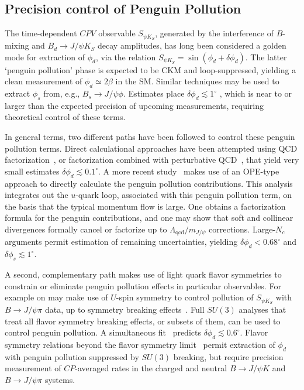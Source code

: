 \subsection{Precision control of Penguin Pollution}
The time-dependent $CPV$ observable $S_{\psi K_S}$, generated by the interference of $B$-mixing and $B_d \to J/\psi K_S$ decay amplitudes, has long been considered a golden mode for extraction of $\phi_d$, via the relation $S_{\psi K_S} = \sin (\phi_d + \delta \phi_d)$. The latter `penguin pollution' phase is expected to be CKM and loop-suppressed, yielding a clean measurement of $\phi_d \simeq 2 \beta$ in the SM. Similar techniques may be used to extract $\phi_s$ from, e.g., $B_s \to J/\psi \phi$. Estimates place $\delta \phi_d \lesssim 1^\circ$ \cite{Boos:2004xp,Ciuchini:2005mg,Li:2006vq,Faller:2008zc,Ciuchini:2011kd,Jung:2012mp,DeBruyn:2014oga,Frings:2015eva,Ligeti:2015yma}, which is near to or larger than the expected precision of upcoming measurements, requiring theoretical control of these terms.

In general terms, two different paths have been followed to control these penguin pollution terms. Direct calculational approaches have been attempted using QCD factorization~\cite{Boos:2004xp}, or factorization combined with perturbative QCD~\cite{Li:2006vq}, that yield very small estimates $\delta \phi_d \lesssim 0.1^\circ$. A more recent study~\cite{Frings:2015eva} makes use of an OPE-type approach to directly calculate the penguin pollution contributions. This analysis integrates out the $u$-quark loop, associated with this penguin pollution term, on the basis that the typical momentum flow is large. One obtains a factorization formula for the penguin contributions, and one may show that soft and collinear divergences formally cancel or factorize up to $\Lambda_{\text{qcd}}/m_{J/\psi}$ corrections. Large-$N_c$ arguments permit estimation of remaining uncertainties, yielding $\delta \phi_d < 0.68^\circ$ and $\delta \phi_s \lesssim 1^\circ$. 

A second, complementary path makes use of light quark flavor symmetries to constrain or eliminate penguin pollution effects in particular observables. For example on may make use of $U$-spin symmetry to  control pollution of $S_{\psi K_S}$ with $B \to J/\psi \pi$ data, up to symmetry breaking effects~\cite{Ciuchini:2005mg,Faller:2008zc,Ciuchini:2011kd,DeBruyn:2014oga}. Full $SU(3)$ analyses \cite{Jung:2012mp,DeBruyn:2014oga, Ligeti:2015yma} that treat all flavor symmetry breaking effects, or subsets of them, can be used to control penguin pollution. A simultaneous fit~\cite{Jung:2012mp} predicts $\delta \phi_d \lesssim 0.6^\circ$.  Flavor symmetry relations beyond the flavor symmetry limit~\cite{Ligeti:2015yma} permit extraction of $\phi_d$ with penguin pollution suppressed by $SU(3)$ breaking, but require precision measurement of $CP$-averaged rates in the charged and neutral $B \to J/\psi K$ and $B \to J/\psi \pi$ systems.

